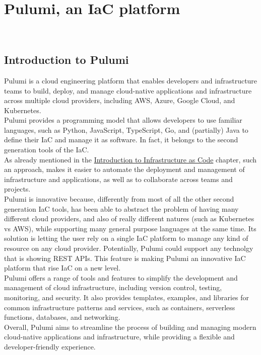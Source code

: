 
\chapter{Pulumi, an IaC platform}
\label{cap:introduction-pulumi}

\\

\section{Introduction to Pulumi}
Pulumi is a cloud engineering platform that enables developers and infrastructure teams to build, deploy, and manage cloud-native applications and infrastructure across multiple cloud providers, including AWS, Azure, Google Cloud, and Kubernetes.\\
Pulumi provides a programming model that allows developers to use familiar languages, such as Python, JavaScript, TypeScript, Go, and (partially) Java to define their IaC and manage it as software.
In fact, it belongs to the second generation tools of the IaC.\\
As already mentioned in the \hyperref[cap:introduction-to-iac]{Introduction to Infrastructure as Code} chapter, such an approach, makes it easier to automate the deployment and management of infrastructure and applications, as well as to collaborate across teams and projects.\\
Pulumi is innovative because, differently from most of all the other second generation IaC tools, has been able to abstract the problem of having many different cloud providers, and also of really different natures (such as Kubernetes vs AWS), while supporting many general purpose languages at the same time.
Its solution is letting the user rely on a single IaC platform to manage any kind of resource on any cloud provider.
Potentially, Pulumi could support any technolgy that is showing \gls{REST API}s.
This feature is making Pulumi an innovative IaC platform that rise IaC on a new level.\\
Pulumi offers a range of tools and features to simplify the development and management of cloud infrastructure, including version control, testing, monitoring, and security.
It also provides templates, examples, and libraries for common infrastructure patterns and services, such as containers, serverless functions, databases, and networking.\\
Overall, Pulumi aims to streamline the process of building and managing modern cloud-native applications and infrastructure, while providing a flexible and developer-friendly experience.

